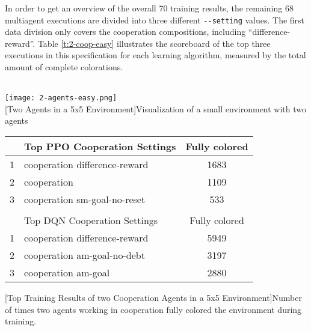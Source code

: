 In order to get an overview of the overall 70 training results, the remaining 68 multiagent executions are divided into three different \verb|--setting| values. The first data division only covers the cooperation compositions, including ``difference-reward''. Table \ref{t:2-coop-easy} illustrates the scoreboard of the top three executions in this specification for each learning algorithm, measured by the total amount of complete colorations. \\\\

\begin{minipage}{\textwidth}
  \begin{minipage}[b]{0.29\textwidth}
    \centering
    \texttt{[image: 2-agents-easy.png]}\\
    [Two Agents in a 5x5 Environment]{Visualization of a small environment with two agents}\label{fig:2-coop-easy}
  \end{minipage}
  \hfill
    \begin{minipage}[b]{0.69\textwidth}
    \centering
    \begin{tabular}{clc}\hline
         & Top PPO Cooperation Settings & Fully colored \\ \hline
        {\small 1} & cooperation difference-reward & 1683 \\
        {\small 2} & cooperation & 1109 \\
        {\small 3} & cooperation sm-goal-no-reset & 533 \\ \hline
         &   \\ \hline
         & Top DQN Cooperation Settings & Fully colored \\ \hline
        {\small 1} & cooperation difference-reward & 5949 \\
        {\small 2} & cooperation am-goal-no-debt & 3197 \\
        {\small 3} & cooperation am-goal & 2880 \\ \hline
        \end{tabular}
        [Top Training Results of two Cooperation Agents in a 5x5 Environment]{Number of times two agents working in cooperation fully colored the environment during training.\\}\label{t:2-coop-easy}
    \end{minipage}
  \end{minipage}\\\\

